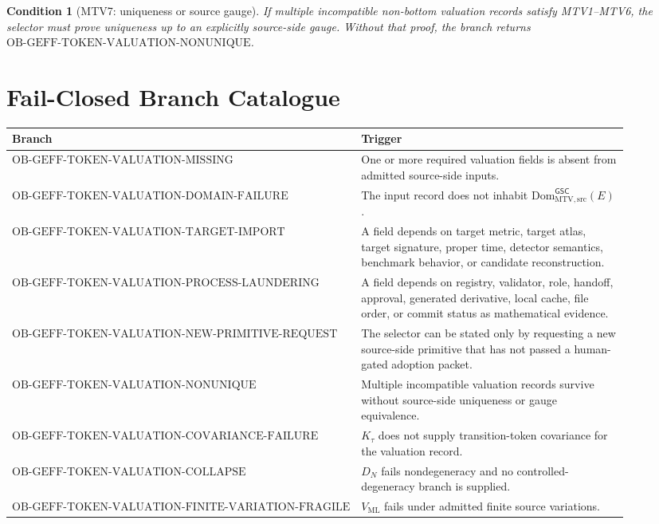 \documentclass[11pt]{article}
\newcommand{\DomMTV}{\mathrm{Dom}_{\mathrm{MTV,src}}^{\mathsf{GSC}}}
\newtheorem{condition}{Condition}
\begin{document}
\begin{condition}[MTV7: uniqueness or source gauge]
If multiple incompatible non-bottom valuation records satisfy MTV1--MTV6, the
selector must prove uniqueness up to an explicitly source-side gauge. Without
that proof, the branch returns
\(\mathrm{OB\mbox{-}GEFF\mbox{-}TOKEN\mbox{-}VALUATION\mbox{-}NONUNIQUE}\).
\end{condition}

\section{Fail-Closed Branch Catalogue}

\begin{longtable}{p{0.36\linewidth}p{0.54\linewidth}}
\toprule
Branch & Trigger \\
\midrule
\(\mathrm{OB\mbox{-}GEFF\mbox{-}TOKEN\mbox{-}VALUATION\mbox{-}MISSING}\) &
One or more required valuation fields is absent from admitted source-side
inputs. \\
\(\mathrm{OB\mbox{-}GEFF\mbox{-}TOKEN\mbox{-}VALUATION\mbox{-}DOMAIN\mbox{-}FAILURE}\) &
The input record does not inhabit \(\DomMTV(E)\). \\
\(\mathrm{OB\mbox{-}GEFF\mbox{-}TOKEN\mbox{-}VALUATION\mbox{-}TARGET\mbox{-}IMPORT}\) &
A field depends on target metric, target atlas, target signature, proper time,
detector semantics, benchmark behavior, or candidate reconstruction. \\
\(\mathrm{OB\mbox{-}GEFF\mbox{-}TOKEN\mbox{-}VALUATION\mbox{-}PROCESS\mbox{-}LAUNDERING}\) &
A field depends on registry, validator, role, handoff, approval, generated
derivative, local cache, file order, or commit status as mathematical
evidence. \\
\(\mathrm{OB\mbox{-}GEFF\mbox{-}TOKEN\mbox{-}VALUATION\mbox{-}NEW\mbox{-}PRIMITIVE\mbox{-}REQUEST}\) &
The selector can be stated only by requesting a new source-side primitive
that has not passed a human-gated adoption packet. \\
\(\mathrm{OB\mbox{-}GEFF\mbox{-}TOKEN\mbox{-}VALUATION\mbox{-}NONUNIQUE}\) &
Multiple incompatible valuation records survive without source-side uniqueness
or gauge equivalence. \\
\(\mathrm{OB\mbox{-}GEFF\mbox{-}TOKEN\mbox{-}VALUATION\mbox{-}COVARIANCE\mbox{-}FAILURE}\) &
\(K_{\tau}\) does not supply transition-token covariance for the valuation
record. \\
\(\mathrm{OB\mbox{-}GEFF\mbox{-}TOKEN\mbox{-}VALUATION\mbox{-}COLLAPSE}\) &
\(D_N\) fails nondegeneracy and no controlled-degeneracy branch is supplied. \\
\(\mathrm{OB\mbox{-}GEFF\mbox{-}TOKEN\mbox{-}VALUATION\mbox{-}FINITE\mbox{-}VARIATION\mbox{-}FRAGILE}\) &
\(V_{\mathrm{ML}}\) fails under admitted finite source variations. \\
\bottomrule
\end{longtable}
\end{document}
